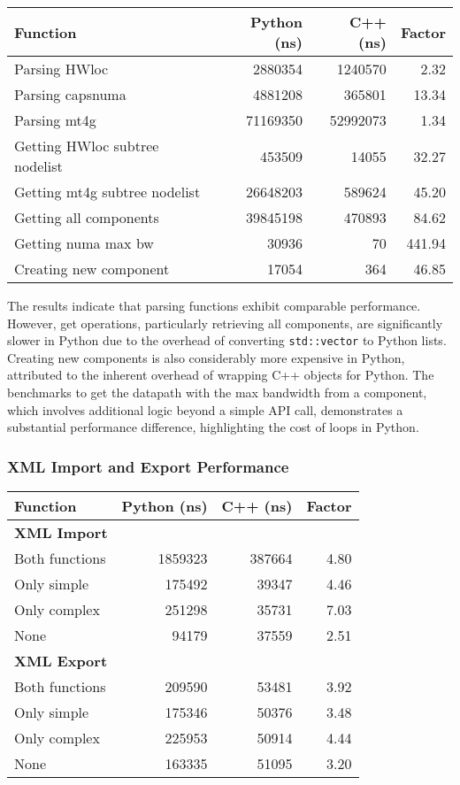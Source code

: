\begin{center}
\begin{tabular}{lrrr}
\textbf{Function} & \textbf{Python (ns)} & \textbf{C++ (ns)} & \textbf{Factor} \\
\hline
Parsing HWloc & 2880354 & 1240570 & 2.32 \\
Parsing capsnuma & 4881208 & 365801 & 13.34 \\
Parsing mt4g & 71169350 & 52992073 & 1.34 \\
Getting HWloc subtree nodelist & 453509 & 14055 & 32.27 \\
Getting mt4g subtree nodelist & 26648203 & 589624 & 45.20 \\
Getting all components & 39845198 & 470893 & 84.62 \\
Getting numa max bw & 30936 & 70 & 441.94 \\
Creating new component & 17054 & 364 & 46.85 \\
\end{tabular}
\end{center}

The results indicate that parsing functions exhibit comparable performance. However, get operations, particularly retrieving all components, are significantly slower in Python due to the overhead of converting \texttt{std::vector} to Python lists. Creating new components is also considerably more expensive in Python, attributed to the inherent overhead of wrapping C++ objects for Python. The benchmarks to get the datapath with the max bandwidth from a component, which involves additional logic beyond a simple API call, demonstrates a substantial performance difference, highlighting the cost of loops in Python.

\subsubsection{XML Import and Export Performance}

\begin{center}
\begin{tabular}{lrrr}
\textbf{Function} & \textbf{Python (ns)} & \textbf{C++ (ns)} & \textbf{Factor} \\
\hline
\textbf{XML Import} & & & \\
Both functions & 1859323 & 387664 & 4.80 \\
Only simple & 175492 & 39347 & 4.46 \\
Only complex & 251298 & 35731 & 7.03 \\
None & 94179 & 37559 & 2.51 \\
\textbf{XML Export} & & & \\
Both functions & 209590 & 53481 & 3.92 \\
Only simple & 175346 & 50376 & 3.48 \\
Only complex & 225953 & 50914 & 4.44 \\
None & 163335 & 51095 & 3.20 \\
\end{tabular}
\end{center}

